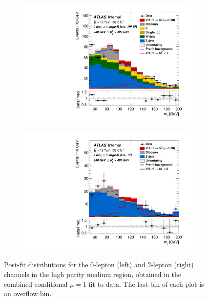 \begin{figure}[!htbp]
  \centering
  \begin{subfigure}{.4\textwidth}
    \centering
    \includegraphics[width=\textwidth]{chapters/6.vhbb_boosted/figs/Region_BMax400_BMin250_incFat1_Fat1_Y6051_DSRnoaddbjetsr_T2_L0_distmBB_J0_GlobalFit_conditionnal_mu1.pdf}
  \end{subfigure}%
  \begin{subfigure}{.4\textwidth}
    \centering
    \includegraphics[width=\textwidth]{chapters/6.vhbb_boosted/figs/Region_distmBB_J0_L2_T2_DSR_Y6051_incJet1_Fat1_incFat1_BMin250_BMax400_GlobalFit_conditionnal_mu1.pdf}
  \end{subfigure}
  \caption{
    Post-fit distributions for the 0-lepton (left) and 2-lepton (right) channels in the high purity medium \pTV region, obtained in the combined conditional $\mu=1$ fit to data. The last bin of each plot is an overflow bin.
  }
  \label{fig:vhbb postfit plots}
\end{figure}


